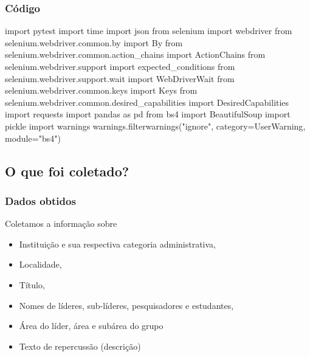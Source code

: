 \documentclass[
  brazilian,
  letterpaper,
  DIV=11,
  numbers=noendperiod]{scrartcl}
\newenvironment{Shaded}{\begin{snugshade}}{\end{snugshade}}
\newcommand{\ImportTok}[1]{\textcolor[rgb]{0.00,0.46,0.62}{#1}}
\newcommand{\NormalTok}[1]{\textcolor[rgb]{0.00,0.23,0.31}{#1}}
\newcommand{\OperatorTok}[1]{\textcolor[rgb]{0.37,0.37,0.37}{#1}}
\newcommand{\PreprocessorTok}[1]{\textcolor[rgb]{0.68,0.00,0.00}{#1}}
\newcommand{\StringTok}[1]{\textcolor[rgb]{0.13,0.47,0.30}{#1}}
\providecommand{\tightlist}{%
  \setlength{\itemsep}{0pt}\setlength{\parskip}{0pt}}
\begin{document}
\subsubsection{Código}

\begin{Shaded}
\begin{Highlighting}[]

\ImportTok{import}\NormalTok{ pytest}
\ImportTok{import}\NormalTok{ time}
\ImportTok{import}\NormalTok{ json}
\ImportTok{from}\NormalTok{ selenium }\ImportTok{import}\NormalTok{ webdriver}
\ImportTok{from}\NormalTok{ selenium.webdriver.common.by }\ImportTok{import}\NormalTok{ By}
\ImportTok{from}\NormalTok{ selenium.webdriver.common.action\_chains }\ImportTok{import}\NormalTok{ ActionChains}
\ImportTok{from}\NormalTok{ selenium.webdriver.support }\ImportTok{import}\NormalTok{ expected\_conditions}
\ImportTok{from}\NormalTok{ selenium.webdriver.support.wait }\ImportTok{import}\NormalTok{ WebDriverWait}
\ImportTok{from}\NormalTok{ selenium.webdriver.common.keys }\ImportTok{import}\NormalTok{ Keys}
\ImportTok{from}\NormalTok{ selenium.webdriver.common.desired\_capabilities }\ImportTok{import}\NormalTok{ DesiredCapabilities}
\ImportTok{import}\NormalTok{ requests}
\ImportTok{import}\NormalTok{ pandas }\ImportTok{as}\NormalTok{ pd}
\ImportTok{from}\NormalTok{ bs4 }\ImportTok{import}\NormalTok{ BeautifulSoup}
\ImportTok{import}\NormalTok{ pickle}
\ImportTok{import}\NormalTok{ warnings}
\NormalTok{warnings.filterwarnings(}\StringTok{"ignore"}\NormalTok{, category}\OperatorTok{=}\PreprocessorTok{UserWarning}\NormalTok{, module}\OperatorTok{=}\StringTok{"bs4"}\NormalTok{)}
\end{Highlighting}
\end{Shaded}

\subsection{O que foi coletado?}\label{o-que-foi-coletado}

\subsubsection{Dados obtidos}

Coletamos a informação sobre

\begin{itemize}
\tightlist
\item
  Instituição e sua respectiva categoria administrativa,
\item
  Localidade,
\item
  Título,
\item
  Nomes de líderes, sub-líderes, pesquisadores e estudantes,
\item
  Área do líder, área e subárea do grupo
\item
  Texto de repercussão (descrição)
\end{itemize}
\end{document}
